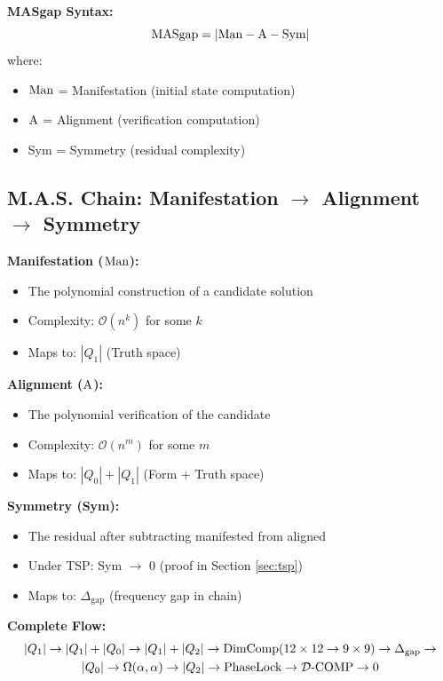 \textbf{MASgap Syntax:}
\begin{equation}
    \text{MASgap} = |\mathrm{Man} - \mathrm{A} - \text{Sym}|
\end{equation}
where:
\begin{itemize}
    \item $\mathrm{Man}$ = Manifestation (initial state computation)
    \item $\mathrm{A}$ = Alignment (verification computation)
    \item Sym = Symmetry (residual complexity)
\end{itemize}

\subsection{M.A.S. Chain: Manifestation $\to$ Alignment $\to$ Symmetry}

\textbf{Manifestation ($\mathrm{Man}$):}
\begin{itemize}
    \item The polynomial construction of a candidate solution
    \item Complexity: $\mathcal{O}(n^k)$ for some $k$
    \item Maps to: $|Q_1|$ (Truth space)
\end{itemize}

\textbf{Alignment ($\mathrm{A}$):}
\begin{itemize}
    \item The polynomial verification of the candidate
    \item Complexity: $\mathcal{O}(n^m)$ for some $m$
    \item Maps to: $|Q_0| + |Q_1|$ (Form + Truth space)
\end{itemize}

\textbf{Symmetry (Sym):}
\begin{itemize}
    \item The residual after subtracting manifested from aligned
    \item Under TSP: Sym $\to$ 0 (proof in Section \ref{sec:tsp})
    \item Maps to: $\Delta_{\text{gap}}$ (frequency gap in chain)
\end{itemize}

\textbf{Complete Flow:}
\begin{multline}
    |Q_1| \to |Q_1| + |Q_0| \to |Q_1| + |Q_2| \to \text{DimComp}(12\times 12 \to 9\times 9) \to \Delta_{\text{gap}} \to \\
    |Q_0| \to \Omega(\alpha,\alpha) \to |Q_2| \to \text{PhaseLock} \to \mathcal{D}\text{-}\mathrm{COMP} \to 0
\end{multline}

